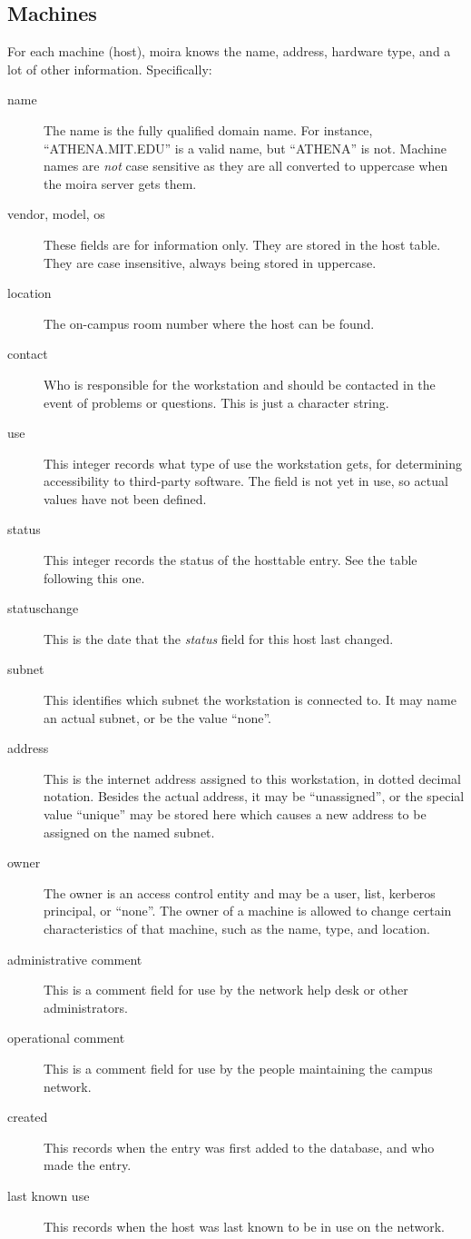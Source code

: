\documentclass{book}
\begin{document}
\subsection{Machines}
For each machine (host), moira knows the name, address, hardware type,
and a lot of other information. Specifically:
\begin{description}
\item[name] The name is the fully qualified domain name.  For
instance, ``ATHENA.MIT.EDU'' is a valid name, but ``ATHENA'' is not.
 Machine names are {\em not} case sensitive as they
are all converted to uppercase when the moira server gets them.
\item[vendor, model, os] These fields are for information only.  They
are stored in the host table.  They are case insensitive, always being
stored in uppercase.
\item[location] The on-campus room number where the host can be found.
\item[contact] Who is responsible for the workstation and should be
contacted in the event of problems or questions.  This is just a
character string.
\item[use] This integer records what type of use the workstation gets,
for determining accessibility to third-party software.  The field is
not yet in use, so actual values have not been defined.
\item[status] This integer records the status of the hosttable entry.
See the table following this one.
\item[statuschange] This is the date that the {\em status} field for
this host last changed.
\item[subnet] This identifies which subnet the workstation is
connected to.  It may name an actual subnet, or be the value ``none''.
\item[address] This is the internet address assigned to this
workstation, in dotted decimal notation.  Besides the actual address,
it may be ``unassigned'', or the special value ``unique'' may be
stored here which causes a new address to be assigned on the named
subnet.
\item[owner] The owner is an access control entity and may be a user,
list, kerberos principal, or ``none''.  The owner of a machine is
allowed to change certain characteristics of that machine, such as the
name, type, and location.
\item[administrative comment] This is a comment field for use by the
network help desk or other administrators.
\item[operational comment] This is a comment field for use by the
people maintaining the campus network.
\item[created] This records when the entry was first added to the
database, and who made the entry.
\item[last known use] This records when the host was last known to be
in use on the network.
\end{description}
\end{document}
